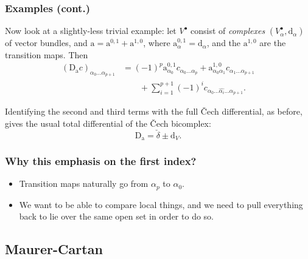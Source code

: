 \documentclass{beamer}
\begin{document}
        \begin{frame}\frametitle{Examples (cont.)}
            \begin{example}
                Now look at a slightly-less trivial example: let $V^\bullet$ consist of \emph{complexes} $(V_\alpha^\bullet,\mathrm{d}_\alpha)$ of vector bundles, and $\mathrm{a} = \mathrm{a}^{0,1}+\mathrm{a}^{1,0}$, where $\mathrm{a}_{\alpha}^{0,1} = \mathrm{d}_\alpha$, and the $\mathrm{a}^{1,0}$ are the transition maps.
                Then
                \begin{align*}
                    (\mathrm{D}_\mathrm{a}c)_{\alpha_0\ldots\alpha_{p+1}} &= (-1)^p\mathrm{a}_{\alpha_0}^{0,1}c_{\alpha_0\ldots\alpha_p} + \mathrm{a}_{\alpha_0\alpha_1}^{1,0}c_{\alpha_1\ldots\alpha_{p+1}}\\
                    &\qquad+\sum_{i=1}^{p+1}(-1)^i c_{\alpha_0\ldots\widehat{\alpha_i}\ldots\alpha_{p+1}}.
                \end{align*}

                \pause
                
                Identifying the second and third terms with the full Čech differential, as before, gives the usual total differential of the Čech bicomplex:
                \begin{equation*}
                    \mathrm{D}_\mathrm{a} = \check{\delta} \pm \mathrm{d}_V.
                \end{equation*}
            \end{example}
        \end{frame}

        \begin{frame}\frametitle{Why this emphasis on the first index?}
            \begin{itemize}
                \item Transition maps naturally go from $\alpha_p$ to $\alpha_0$.
                \pause
                \item We want to be able to compare local things, and we need to pull everything back to lie over the same open set in order to do so.
            \end{itemize}
        \end{frame}

    \subsection{Maurer-Cartan}
\end{document}
